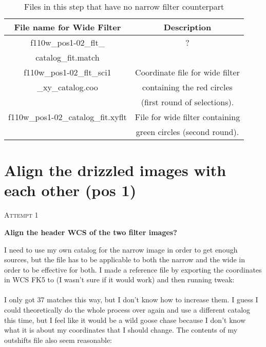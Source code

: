 \documentclass[11pt,obeyspaces]{article} %
\begin{document}
\begin{table}
\caption{Files in this step that have no narrow filter counterpart}
\begin{center}
\begin{tabular}{|c|c|} \hline
File name for Wide Filter & Description \\ \hline \hline
f110w\_pos1-02\_flt\_ & ? \\ 
catalog\_fit.match &  \\ \hline
f110w\_pos1-02\_flt\_sci1 & Coordinate file for wide filter \\
\_xy\_catalog.coo &  containing the red circles \\
& (first round of selections). \\ \hline
f110w\_pos1-02\_catalog\_fit.xyflt &  File for wide filter containing\\
&  green circles (second round). \\ \hline
\end{tabular}
\end{center}
\label{table:step1}
\end{table}


\newpage

\section{Align the drizzled images with each other (pos 1)}
\bigskip
\bigskip
\centerline{\textsc{\Large Attempt 1}}
\bigskip
{\large \bf Align the header WCS of the two filter images?}

I need to use my own catalog for the narrow image in order to get enough sources, but the file has to be applicable to both the narrow and the wide in order to be effective for both. I made a reference file by exporting the coordinates in WCS FK5 to  (I wasn't sure if it would work) and then running tweak: \\

 \\

I only got 37 matches this way, but I don't know how to increase them. I guess I could theoretically do the whole process over again and use a different catalog this time, but I feel like it would be a wild goose chase because I don't know what it is about my coordinates that I should change. The contents of my outshifts file also seem reasonable: \\
\end{document}
